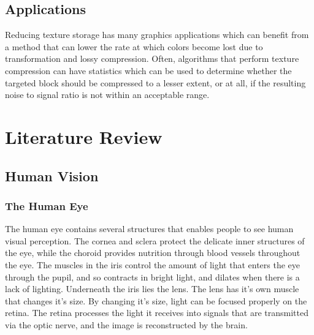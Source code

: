 \documentclass[12pt]{article}
\begin{document}
\subsection{Applications}
Reducing texture storage has many graphics applications which can benefit from a method that can lower the rate at which colors become lost due to transformation and lossy compression. Often, algorithms that perform texture compression can have statistics which can be used to determine whether the targeted block should be compressed to a lesser extent, or at all, if the resulting noise to signal ratio is not within an acceptable range.

\section{Literature Review}

\subsection{Human Vision}

\subsubsection{The Human Eye}
The human eye contains several structures that enables people to see human visual perception. The cornea and sclera protect the delicate inner structures of the eye, while the choroid provides nutrition through blood vessels throughout the eye. The muscles in the iris control the amount of light that enters the eye through the pupil, and so contracts in bright light, and dilates when there is a lack of lighting. Underneath the iris lies the lens. The lens has it's own muscle that changes it's size. By changing it's size, light can be focused properly on the retina. The retina processes the light it receives into signals that are transmitted via the optic nerve, and the image is reconstructed by the brain.
\end{document}

